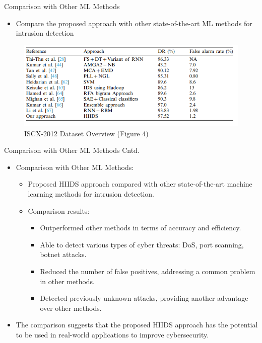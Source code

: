 \documentclass{beamer}
\begin{document}
\begin{frame}{Comparison with Other ML Methods}
  \begin{itemize}
    \item Compare the proposed approach with other state-of-the-art ML methods for intrusion detection
  \end{itemize}

  \begin{figure}
    \centering
    \includegraphics[width=1\textwidth]{Table 7.PNG}
    \caption{ISCX-2012 Dataset Overview (Figure 4)}
  \end{figure}

  
  
\end{frame}

\begin{frame}{Comparison with Other ML Methods Cntd.}

  \begin{itemize}
    \item Comparison with Other ML Methods:
      \begin{itemize}
        \item Proposed HIIDS approach compared with other state-of-the-art machine learning methods for intrusion detection.
        \item Comparison results:
          \begin{itemize}
            \item Outperformed other methods in terms of accuracy and efficiency.
            \item Able to detect various types of cyber threats: DoS, port scanning, botnet attacks.
            \item Reduced the number of false positives, addressing a common problem in other methods.
            \item Detected previously unknown attacks, providing another advantage over other methods.
          \end{itemize}
      \end{itemize}
    \item The comparison suggests that the proposed HIIDS approach has the potential to be used in real-world applications to improve cybersecurity.

  \end{itemize}
\end{frame}
\end{document}
